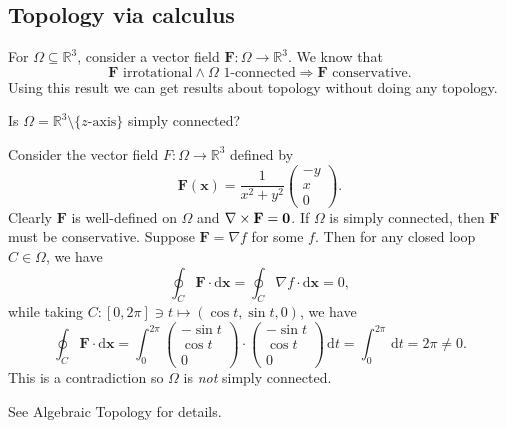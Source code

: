 \subsection{Topology via calculus}
For $ \Omega \subseteq \mathbb{R}^{3} $, consider a vector field $ \mathbf{F}:\Omega\to \mathbb{R}^{3} $. We know that 
\[
    \mathbf{F} \text{ irrotational} \land \Omega \text{ 1-connected} \Longrightarrow \mathbf{F} \text{ conservative}.
\]
Using this result we can get results about topology without doing any topology.
\begin{example}
    Is $ \Omega = \mathbb{R}^{3}\setminus \{z\text{-axis}\} $ simply connected?

    Consider the vector field $F : \Omega\to \mathbb{R}^{3}$ defined by
    \[
        \mathbf{F}(\mathbf{x}) = \frac{1}{x^2+y^2}\begin{pmatrix}
            -y \\ x \\ 0
        \end{pmatrix}.
    \]
    Clearly $\mathbf{F}$ is well-defined on $\Omega$ and $ \nabla\times\mathbf{F}=\mathbf{0} $. If $ \Omega $ is simply connected, then $\mathbf{F}$ must be conservative. Suppose $ \mathbf{F} = \nabla f $ for some $f$. Then for any closed loop $C\in \Omega$, we have 
    \[
        \oint_{C} \mathbf{F}\cdot\mathrm{d} \mathbf{x} = \oint_C \nabla f \cdot \mathrm{d} \mathbf{x} = 0,
    \]
    while taking $ C:[0,2\pi]\ni t \mapsto (\cos t,\sin t,0) $, we have
    \[
        \oint_{C} \mathbf{F}\cdot\mathrm{d}\mathbf{x} = \int_{0}^{2\pi} \begin{pmatrix}
            -\sin t \\ \cos t \\ 0
        \end{pmatrix} \cdot \begin{pmatrix}
            -\sin t \\ \cos t \\ 0
        \end{pmatrix} \,\mathrm{d}t = \int_{0}^{2\pi}  \,\mathrm{d}t=2\pi\neq 0.
    \]
    This is a contradiction so $\Omega$ is \textit{not} simply connected.
\end{example}
See Algebraic Topology for details.